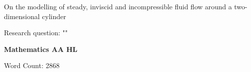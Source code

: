 \begin{titlepage}
	\begin{center}
		\vspace*{2cm}
		\Large On the modelling of steady, inviscid and incompressible fluid flow around a two-dimensional cylinder

		\vspace{1.5cm}
		\normalsize Research question: "\textbf{\researchquestion}"

		\vspace{1.5cm}
		\large\textbf{Mathematics AA HL}

		\vfill
		\color{darkgray} Word Count: 2868
	\end{center}
\end{titlepage}

\tableofcontents\newpage